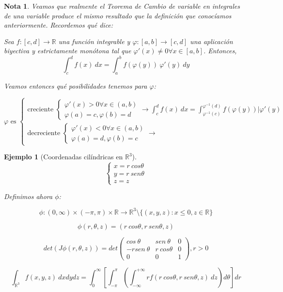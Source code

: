 \documentclass[11pt, a4paper]{article}
\newif\IfInSansMode
\newcommand{\R}{\mathbb{R}} \newcommand{\N}{\mathbb{N}}
\theoremstyle{theorem-style}
\theoremstyle{definition-style}
\theoremstyle{remark-style}
\newtheorem*{nota}{Nota}
\theoremstyle{example-style}
\newtheorem{ejemplo}{Ejemplo}[section]
\begin{document}
\begin{nota} %
 Veamos que realmente el Teorema de Cambio de variable en integrales de una
 variable produce el mismo resultado que la definición que conocíamos
 anteriormente. Recordemos qué dice:

 Sea $f: [c, d] \rightarrow \R$ una función integrable y $\varphi: [a, b]
\rightarrow [c, d]$ una aplicación biyectiva y estrictamente monótona tal que $\varphi'(x) \neq 0 \forall
x \in [a, b]$. Entonces,
$$\int_c^df(x) \ dx = \int_a^bf(\varphi(y)) \ \varphi'(y)
\ dy$$

Veamos entonces qué posibilidades tenemos para $\varphi$:

$$ \varphi \text{ es }
\begin{cases}
  \text{creciente }
  \begin{cases}
    \varphi'(x) > 0 \forall x \in (a,b) \\
    \varphi(a) = c, \varphi(b) = d
  \end{cases}
  \rightarrow \int_c^d f(x) \ dx = \int_{\varphi^{-1}(c)}^{\varphi^{-1}(d)}
  f(\varphi(y)) |\varphi'(y) \\
  \text{decreciente }
  \begin{cases}
    \varphi'(x) < 0 \forall x \in (a,b) \\
    \varphi(a) = d, \varphi(b) = c
  \end{cases}
  \rightarrow
\end{cases}$$

\end{nota}


\begin{ejemplo}[Coordenadas cilíndricas en $\R^3$]
  $$
\begin{cases}
  x = r \ cos \theta \\
  y = r \ sen \theta \\
  z = z
\end{cases}
$$

Definimos ahora $\phi$:

$$\phi : (0, \infty) \times (-\pi, \pi) \times \R \rightarrow \R^3 \setminus
\{(x,y,z) : x \leq 0, z \in \R \}$$

$$\phi(r, \theta, z) = (r \ cos \theta, r \ sen \theta, z)$$

$$det(J \phi (r, \theta, z)) = det
\begin{pmatrix}
  cos \ \theta & sen \ \theta & 0 \\
  -rsen \ \theta & r \ cos \theta & 0 \\
  0 & 0 & 1
\end{pmatrix}, r > 0$$

$$\int_{\R^3}f(x,y,z) \ dxdydz = \int_0^{\infty} \left[ \int_{-\pi}^{\pi} \left(
  \int_{-\infty}^{+\infty}rf(r \ cos \theta, r \ sen \theta, z) \ dz \right) d
\theta \right]dr$$
\end{ejemplo}
\end{document}
